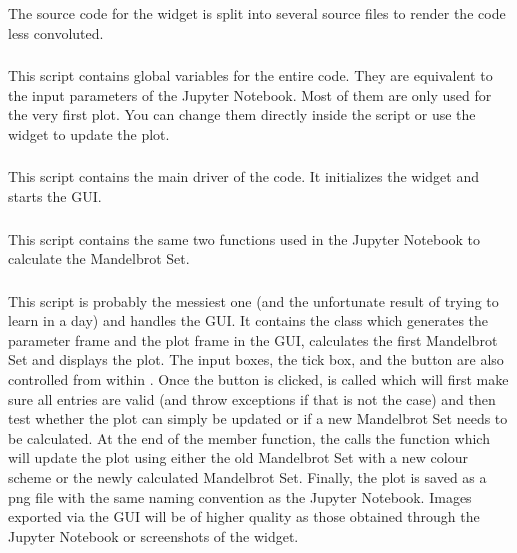\documentclass[
  12pt,					%
  a4paper,				%
  twoside,				%
]{report}
\begin{document}
The source code for the widget is split into several source files to render the code less convoluted.

\subsubsection{{}}
This script contains global variables for the entire code. They are equivalent to the input parameters of the Jupyter Notebook. Most of them are only used for the very first plot. You can change them directly inside the script or use the widget to update the plot.

\subsubsection{{}}
This script contains the main driver of the code. It initializes the widget and starts the GUI.

\subsubsection{{}}
This script contains the same two functions used in the Jupyter Notebook to calculate the Mandelbrot Set.

\subsubsection{{}}
This script is probably the messiest one (and the unfortunate result of trying to learn {} in a day) and handles the GUI. It contains the class {} which generates the parameter frame and the plot frame in the GUI, calculates the first Mandelbrot Set and displays the plot. The input boxes, the tick box, and the button are also controlled from within {}. Once the button is clicked, {} is called which will first make sure all entries are valid (and throw exceptions if that is not the case) and then test whether the plot can simply be updated or if a new Mandelbrot Set needs to be calculated. At the end of the member function, the {} calls the function {} which will update the plot using either the old Mandelbrot Set with a new colour scheme or the newly calculated Mandelbrot Set. Finally, the plot is saved as a png file with the same naming convention as the Jupyter Notebook. Images exported via the GUI will be of higher quality as those obtained through the Jupyter Notebook or screenshots of the widget.
\end{document}
